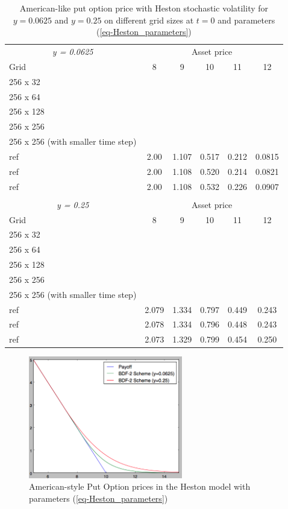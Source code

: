 \documentclass[12pt,a4paper]{article}
\begin{document}
\begin{table}
\label{tab-heston_prices}
\centering
\begin{tabular}{l|ccccc}
\multicolumn{1}{c}{\textit{y = 0.0625}} &  \multicolumn{5}{c}{Asset price} \\
Grid & 8 & 9 & 10 & 11 & 12 \\
\hline
256 x 32 &  & & & & \\
256 x 64 & & & & & \\
256 x 128 & & & & & \\
256 x 256 & & & & & \\
256 x 256 (with smaller time step) & & & & & \\
\hline
ref \cite{Oosterlee} & 2.00 & 1.107 & 0.517 & 0.212 & 0.0815 \\
ref \cite{MR1628686} & 2.00 & 1.108 & 0.520 & 0.214 & 0.0821 \\
ref  \cite{ClarkeParrot} & 2.00 & 1.108 & 0.532 & 0.226 & 0.0907 \\ 
\hline
\multicolumn{6}{c}{} \\
\multicolumn{1}{c}{\textit{y = 0.25}} &  \multicolumn{5}{c}{Asset price} \\
Grid & 8 & 9 & 10 & 11 & 12 \\
\hline
256 x 32 &  & & & & \\
256 x 64 & & & & & \\
256 x 128 & & & & & \\
256 x 256 & & & & & \\
256 x 256 (with smaller time step) & & & & & \\
\hline
ref \cite{Oosterlee} & 2.079 & 1.334 & 0.797 & 0.449 & 0.243 \\
ref \cite{MR1628686} & 2.078 & 1.334 & 0.796 & 0.448 & 0.243 \\
ref  \cite{ClarkeParrot} & 2.073 & 1.329 & 0.799 & 0.454 & 0.250 \\
\hline
\end{tabular}
\caption{American-like put option price with Heston stochastic volatility for $y=0.0625$ and $y=0.25$ on different grid sizes at $t=0$ and parameters (\ref{eq-Heston_parameters})}
\end{table}

\begin{figure}
\center
\label{fig-Heston}
\caption{American-style Put Option prices in the Heston model with parameters (\ref{eq-Heston_parameters})}
\includegraphics[width=0.6\textwidth]{img/Heston_price.png}
\end{figure}
\end{document}
